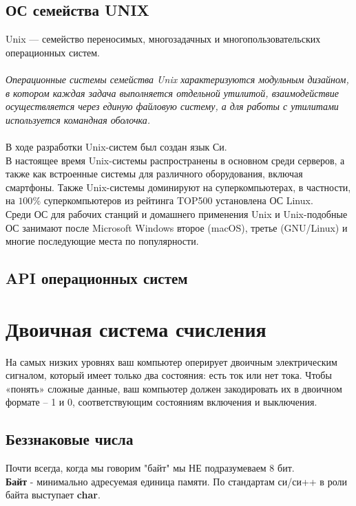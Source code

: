 \documentclass[12pt]{article}
\begin{document}
\subsection{ОС семейства UNIX}
\rm Unix  — семейство переносимых, многозадачных и многопользовательских операционных систем. \\
\\
{ \sl Операционные системы семейства Unix характеризуются модульным дизайном, в котором каждая задача выполняется отдельной утилитой, взаимодействие осуществляется через единую файловую систему, а для работы с утилитами используется командная оболочка.} \\
\\
В ходе разработки Unix-систем был создан язык Си. \\
В настоящее время Unix-системы распространены в основном среди серверов, а также как встроенные системы для различного оборудования, включая смартфоны. Также Unix-системы доминируют на суперкомпьютерах, в частности, на $ 100\% $ суперкомпьютеров из рейтинга TOP500 установлена ОС Linux. \\
Среди ОС для рабочих станций и домашнего применения Unix и Unix-подобные ОС занимают после Microsoft Windows второе (macOS), третье (GNU/Linux) и многие последующие места по популярности. \\

\subsection{API операционных систем}

\section{Двоичная система счисления}
На самых низких уровнях ваш компьютер оперирует двоичным электрическим сигналом, который имеет только два состояния: есть ток или нет тока. Чтобы «понять» сложные данные, ваш компьютер должен закодировать их в двоичном формате – 1 и 0, соответствующим состояниям включения и выключения. 

\subsection{Беззнаковые числа}
Почти всегда, когда мы говорим "байт" мы НЕ подразумеваем 8 бит. \\
{\bf Байт} - минимально адресуемая единица памяти. По стандартам си/си++ в роли байта выступает {\bf char}. 
\end{document}
